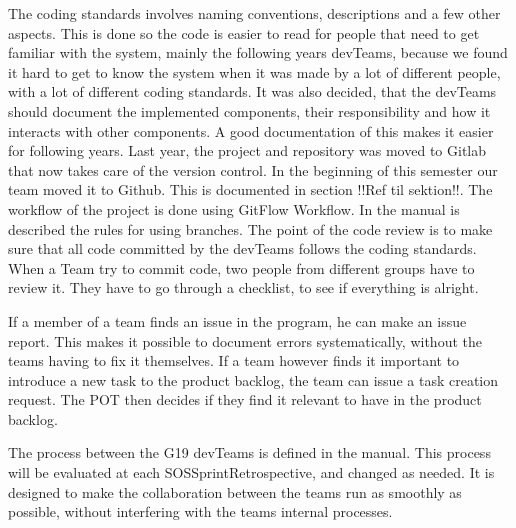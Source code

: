 The coding standards involves naming conventions, descriptions and a few other aspects. This is done so the code is easier to read for people that need to get familiar with the system, mainly the following years \glspl{devTeam}, because we found it hard to get to know the system when it was made by a lot of different people, with a lot of different coding standards.
It was also decided, that the \glspl{devTeam} should document the implemented components, their responsibility and how it interacts with other components. A good documentation of this makes it easier for following years. 
Last year, the project and repository was moved to Gitlab that now takes care of the version control. In the beginning of this semester our team moved it to Github. This is documented in section !!Ref til sektion!!. The workflow of the project is done using GitFlow Workflow. In the manual is described the rules for using branches. 
The point of the code review is to make sure that all code committed by the \glspl{devTeam} follows the coding standards. When a Team try to commit code, two people from different groups have to review it. They have to go through a checklist, to see if everything is alright. 

If a member of a team finds an issue in the program, he can make an issue report. This makes it possible to document errors systematically, without the \glspl{team} having to fix it themselves. If a \gls{team} however finds it important to introduce a new task to the product backlog, the team can issue a task creation request. The \gls{POT} then decides if they find it relevant to have in the product backlog. 

The process between the \gls{G19} \glspl{devTeam} is defined in the manual. This process will be evaluated at each \gls{SOSSprintRetrospective}, and changed as needed. It is designed to make the collaboration between the \glspl{team} run as smoothly as possible, without interfering with the \glspl{team} internal processes.  